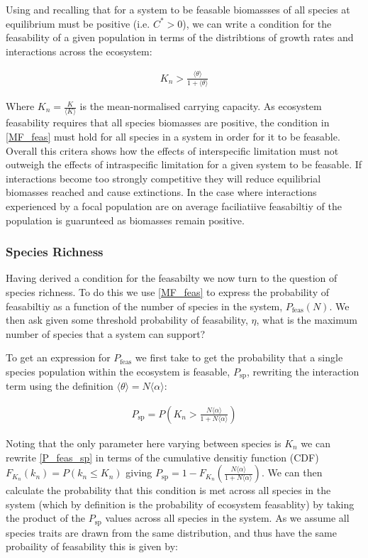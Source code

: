 \documentclass{article}
\begin{document}
Using  and recalling that for a system to be feasable biomassses of all species at equilibrium must be positive (i.e. $C^* > 0$), we can write a condition for the feasability of a given population in terms of the distribtions of growth rates and interactions across the ecosystem:

\begin{align}
  K_n > \frac{\langle \theta \rangle}{1 + \langle \theta \rangle} \label{MF_feas}
\end{align}

Where $K_n = \frac{K}{\langle K \rangle}$ is the mean-normalised carrying capacity. As ecosystem feasability requires that all species biomasses are positive, the condition in \cref{MF_feas} must hold for all species in a system in order for it to be feasable. Overall this critera shows how the effects of interspecific limitation must not outweigh the effects of intraspecific limitation for a given system to be feasable. If interactions become too strongly competitive they will reduce equilibrial biomasses reached and cause extinctions. In the case where interactions experienced by a focal population are on average faciliatiive feasabiltiy of the population is guarunteed as biomasses remain positive.

\subsubsection{Species Richness}
Having derived a condition for the feasabilty we now turn to the question of species richness. To do this we use \cref{MF_feas} to express the probability of feasabiltiy as a function of the number of species in the system, $P_{\text{feas}}(N)$. We then ask given some threshold probability of feasability, $\eta$, what is the maximum number of species that a system can support?

To get an expression for $P_{\text{feas}}$ we first take  to get the probability that a single species population within the ecosystem is feasable, $P_{\text{sp}}$, rewriting the interaction term using the definition $\langle \theta \rangle = N \langle \alpha \rangle$:

\begin{align}
P_{\text{sp}} = P\left(K_n > \frac{N \langle \alpha \rangle}{1 + N \langle \alpha \rangle} \right) \label{P_feas_sp}
\end{align}

Noting that the only parameter here varying between species is $K_n$ we can rewrite \cref{P_feas_sp} in terms of the cumulative densitiy function (CDF) $F_{K_n}(k_n) = P(k_n \leq K_n)$ giving $P_{\text{sp}} = 1 - F_{K_n}\left(\frac{N \langle \alpha \rangle}{1 + N \langle \alpha \rangle}\right)$. We can then calculate the probability that this condition is met across all species in the system (which by definition is the probability of ecosystem feasablity) by taking the product of the $P_{\text{sp}}$ values across all species in the system. As we assume all species traits are drawn from the same distribution, and thus have the same probaility of feasability this is given by:
\end{document}
